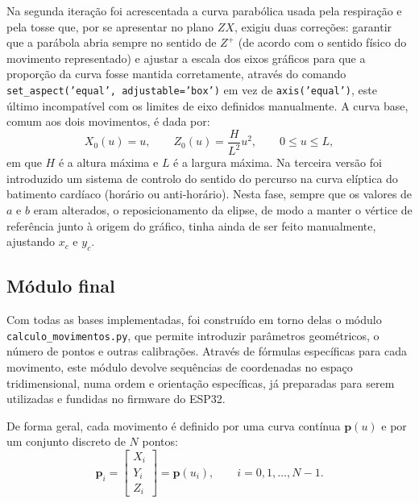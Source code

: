 Na segunda iteração foi acrescentada a curva parabólica usada pela respiração e pela tosse que, por se apresentar no plano \(ZX\), exigiu duas correções: garantir que a parábola abria sempre no sentido de \(Z^+\) (de acordo com o sentido físico do movimento representado) e ajustar a escala dos eixos gráficos para que a proporção da curva fosse mantida corretamente, através do comando \texttt{set\_aspect('equal', adjustable='box')} em vez de \texttt{axis('equal')}, este último incompatível com os limites de eixo definidos manualmente. A curva base, comum aos dois movimentos, é dada por:
\[
X_0(u) = u, \qquad Z_0(u) = \frac{H}{L^2}u^2, \qquad 0 \leq u \leq L,
\]
em que \(H\) é a altura máxima e \(L\) é a largura máxima. Na terceira versão foi introduzido um sistema de controlo do sentido do percurso na curva elíptica do batimento cardíaco (horário ou anti-horário). Nesta fase, sempre que os valores de \(a\) e \(b\) eram alterados, o reposicionamento da elipse, de modo a manter o vértice de referência junto à origem do gráfico, tinha ainda de ser feito manualmente, ajustando \(x_c\) e \(y_c\).

\subsection{Módulo final}
Com todas as bases implementadas, foi construído em torno delas o módulo \texttt{calculo\_movimentos.py}, que permite introduzir parâmetros geométricos, o número de pontos e outras calibrações. Através de fórmulas específicas para cada movimento, este módulo devolve sequências de coordenadas no espaço tridimensional, numa ordem e orientação específicas, já preparadas para serem utilizadas e fundidas no firmware do ESP32.

De forma geral, cada movimento é definido por uma curva contínua \(\mathbf{p}(u)\) e por um conjunto discreto de \(N\) pontos:
\begin{equation}
  \mathbf{p}_i =
  \begin{bmatrix}
    X_i\\Y_i\\Z_i
  \end{bmatrix}
  =
  \mathbf{p}(u_i),
  \qquad i=0,1,\ldots,N-1.
\end{equation}

